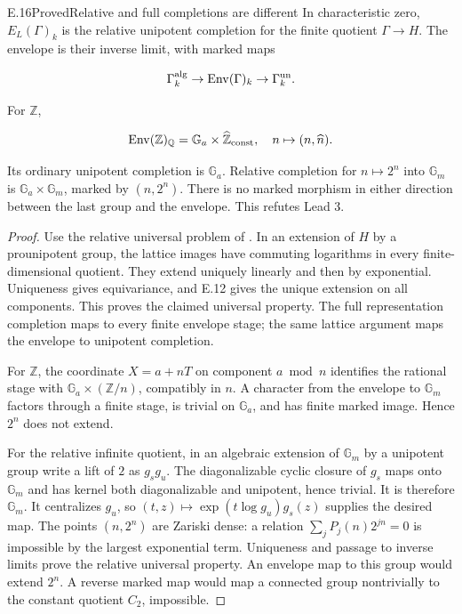 \begin{statement}{E.16}{Proved}{Relative and full completions are different}
In characteristic zero, $E_L(\Gamma)_k$ is the relative
unipotent completion for the finite quotient $\Gamma\to H$.
The envelope is their inverse limit, with marked maps

$$
\Gamma_k^{\rm alg}\to\operatorname{Env}(\Gamma)_k
                  \to\Gamma_k^{\rm un}.
$$

For $\mathbb Z$,

$$
\operatorname{Env}(\mathbb Z)_{\mathbb Q}
   =\mathbb G_a\times\widehat{\mathbb Z}_{\rm const},
 \quad n\mapsto(n,\widehat n).
$$

Its ordinary unipotent completion is $\mathbb G_a$.
Relative completion for $n\mapsto2^n$ into $\mathbb G_m$
is $\mathbb G_a\times\mathbb G_m$, marked by $(n,2^n)$.
There is no marked morphism in either direction between
the last group and the envelope. This refutes Lead 3.
\end{statement}
\begin{proof}
Use the relative universal problem of
\cite[Section 1; Proposition 11.1]{E_Hain1998}.
In an extension of $H$ by a prounipotent group, the
lattice images have commuting logarithms in every
finite-dimensional quotient. They extend uniquely
linearly and then by exponential. Uniqueness gives
equivariance, and E.12 gives the unique extension on
all components. This proves the claimed universal property.
The full representation completion maps to every finite
envelope stage; the same lattice argument maps the
envelope to unipotent completion.

For $\mathbb Z$, the coordinate $X=a+nT$ on component
$a\bmod n$ identifies the rational stage with
$\mathbb G_a\times(\mathbb Z/n)$, compatibly in $n$.
A character from the envelope to $\mathbb G_m$ factors
through a finite stage, is trivial on $\mathbb G_a$,
and has finite marked image. Hence $2^n$ does not extend.

For the relative infinite quotient, in an algebraic
extension of $\mathbb G_m$ by a unipotent group write
a lift of $2$ as $g_sg_u$.
The diagonalizable cyclic closure of $g_s$ maps onto
$\mathbb G_m$ and has kernel both diagonalizable and
unipotent, hence trivial. It is therefore $\mathbb G_m$.
It centralizes $g_u$, so
$(t,z)\mapsto\exp(t\log g_u)g_s(z)$ supplies the desired
map. The points $(n,2^n)$ are Zariski dense: a relation
$\sum_jP_j(n)2^{jn}=0$ is impossible by the largest
exponential term. Uniqueness and passage to inverse
limits prove the relative universal property.
An envelope map to this group would extend $2^n$.
A reverse marked map would map a connected group
nontrivially to the constant quotient $C_2$, impossible.
\end{proof}

